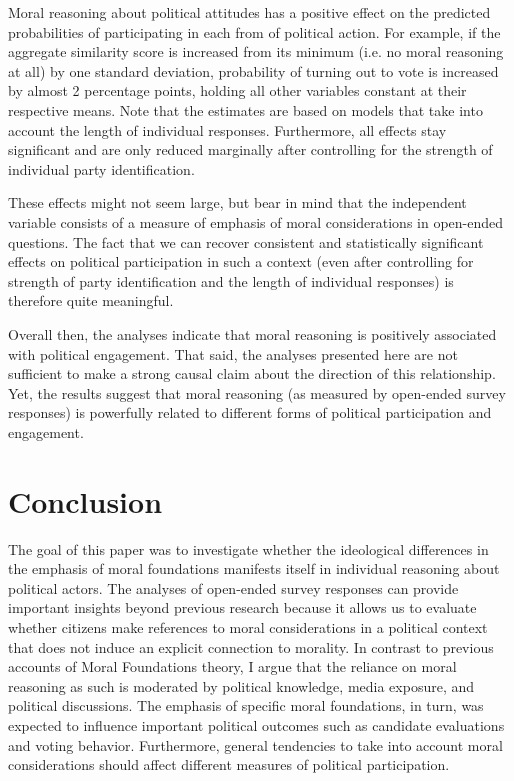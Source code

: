 \documentclass[12pt]{article}
\begin{document}
Moral reasoning about political attitudes has a positive effect on the predicted probabilities of participating in each from of political action. For example, if the aggregate similarity score is increased from its minimum (i.e. no moral reasoning at all) by one standard deviation, probability of turning out to vote is increased by almost 2 percentage points, holding all other variables constant at their respective means. Note that the estimates are based on models that take into account the length of individual responses. Furthermore, all effects stay significant and are only reduced marginally after controlling for the strength of individual party identification.

These effects might not seem large, but bear in mind that the independent variable consists of a measure of emphasis of moral considerations in open-ended questions. The fact that we can recover consistent and statistically significant effects on political participation in such a context (even after controlling for strength of party identification and the length of individual responses) is therefore quite meaningful.

Overall then, the analyses indicate that moral reasoning is positively associated with political engagement. That said, the analyses presented here are not sufficient to make a strong causal claim about the direction of this relationship. Yet, the results suggest that moral reasoning (as measured by open-ended survey responses) is powerfully related to different forms of political participation and engagement.


\section{Conclusion}

The goal of this paper was to investigate whether the ideological differences in the emphasis of moral foundations manifests itself in individual reasoning about political actors. The analyses of open-ended survey responses can provide important insights beyond previous research because it allows us to evaluate whether citizens make references to moral considerations in a political context that does not induce an explicit connection to morality. In contrast to previous accounts of Moral Foundations theory, I argue that the reliance on moral reasoning as such is moderated by political knowledge, media exposure, and political discussions. The emphasis of specific moral foundations, in turn, was expected to influence important political outcomes such as candidate evaluations and voting behavior. Furthermore, general tendencies to take into account moral considerations should affect different measures of political participation.
\end{document}
